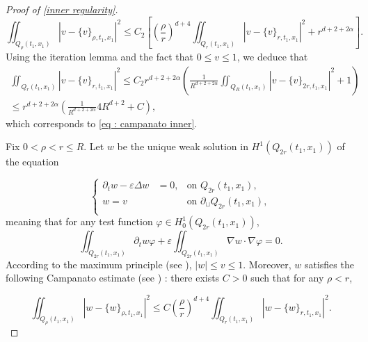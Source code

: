 \documentclass[reqno,12pt,twoside]{amsart}
\numberwithin{equation}{section} \numberwithin{theorem}{section}
\numberwithin{proposition}{section} \numberwithin{lemma}{section}
\numberwithin{corollary}{section}
\numberwithin{definition}{section} \numberwithin{remark}{section}
\begin{document}
\begin{proof}[Proof of \autoref{inner regularity}]
\begin{equation}\label{inner star}
\iint_{Q_\rho(t_1, x_1)} |v -\{v\}_{\rho,t_1, x_1}|^2 \leqslant C_2\left[\left(\frac{\rho}{r}\right)^{d+4} \iint_{Q_r (t_1, x_1)} |v - \{v\}_{r,t_1, x_1}|^2 + r^{d+2+2\alpha} \right].
\end{equation} 
Using the iteration lemma \cite[Lemma 4.3]{L96} and the fact that $0\leqslant v\leqslant 1$, we deduce that 
\begin{multline*}
\iint_{Q_r(t_1,x_1)} |v - \{v\}_{r,t_1,x_1}|^2\leqslant C_2 r^{d+2+2\alpha} \left(\frac{1}{R^{d+2+2\alpha}}\iint_{Q_{R}(t_1,x_1)} |v - \{v\}_{2r, t_1, x_1}|^2 + 1\right)\\
\leqslant r^{d+2+2\alpha} \left(\frac{1}{R^{d+2+2\alpha}}4R^{d+2} + C\right),
\end{multline*}
which corresponds to \eqref{eq : campanato inner}. 

\medskip

Fix $0 < \rho < r\leqslant R$. Let $w$ be the unique weak solution in $H^1(Q_{2r}(t_1,x_1))$ of the equation 

\[\left\{\begin{array}{lll}
\partial_t w - \varepsilon \Delta w &= 0, &\text{on } Q_{2r}(t_1, x_1),\\
w =v& & \text{on } \partial_{\sqcup} Q_{2r}(t_1,x_1),\\
\end{array}\right.\]
meaning that for any test function $\varphi\in H_0^1(Q_{2r}(t_1,x_1))$, 
\[\iint_{Q_{2r}(t_1,x_1)} \partial_t w \varphi + \varepsilon \iint_{Q_{2r}(t_1,x_1)} \nabla w\cdot \nabla \varphi =0.\]
According to the maximum principle (see \cite[Lemma 3.15]{L96}), $|w| \leqslant v\leqslant 1$. Moreover, $w$ satisfies the following Campanato estimate (see \cite[Lemma 4.5]{L96}) : there exists $C >0$ such that for any $\rho < r$,  

\begin{equation}\label{campan1}
\iint_{Q_\rho(t_1,x_1)} |w- \{w\}_{\rho , t_1, x_1}|^2 \leqslant C \left(\frac{\rho}{r}\right)^{d+4}\iint_{Q_r(t_1,x_1)} |w- \{w\}_{r , t_1, x_1}|^2.
\end{equation}


\end{proof}
\end{document}
